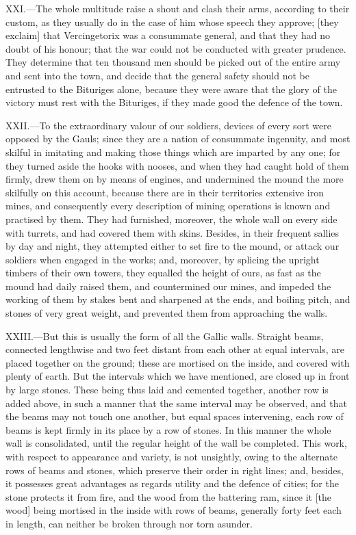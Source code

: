 XXI.—The whole multitude raise a shout and clash their arms, according
to their custom, as they usually do in the case of him whose speech they
approve; [they exclaim] that Vercingetorix was a consummate general, and
that they had no doubt of his honour; that the war could not be
conducted with greater prudence. They determine that ten thousand men
should be picked out of the entire army and sent into the town, and
decide that the general safety should not be entrusted to the Bituriges
alone, because they were aware that the glory of the victory must rest
with the Bituriges, if they made good the defence of the town.

XXII.—To the extraordinary valour of our soldiers, devices of every
sort were opposed by the Gauls; since they are a nation of consummate
ingenuity, and most skilful in imitating and making those things which
are imparted by any one; for they turned aside the hooks with nooses,
and when they had caught hold of them firmly, drew them on by means of
engines, and undermined the mound the more skilfully on this account,
because there are in their territories extensive iron mines, and
consequently every description of mining operations is known and
practised by them. They had furnished, moreover, the whole wall on every
side with turrets, and had covered them with skins. Besides, in their
frequent sallies by day and night, they attempted either to set fire to
the mound, or attack our soldiers when engaged in the works; and,
moreover, by splicing the upright timbers of their own towers, they
equalled the height of ours, as fast as the mound had daily raised them,
and countermined our mines, and impeded the working of them by stakes
bent and sharpened at the ends, and boiling pitch, and stones of very
great weight, and prevented them from approaching the walls.

XXIII.—But this is usually the form of all the Gallic walls. Straight
beams, connected lengthwise and two feet distant from each other at
equal intervals, are placed together on the ground; these are mortised
on the inside, and covered with plenty of earth. But the intervals which
we have mentioned, are closed up in front by large stones. These being
thus laid and cemented together, another row is added above, in such a
manner that the same interval may be observed, and that the beams may
not touch one another, but equal spaces intervening, each row of beams
is kept firmly in its place by a row of stones. In this manner the whole
wall is consolidated, until the regular height of the wall be completed.
This work, with respect to appearance and variety, is not unsightly,
owing to the alternate rows of beams and stones, which preserve their
order in right lines; and, besides, it possesses great advantages as
regards utility and the defence of cities; for the stone protects it
from fire, and the wood from the battering ram, since it [the wood]
being mortised in the inside with rows of beams, generally forty feet
each in length, can neither be broken through nor torn asunder.


